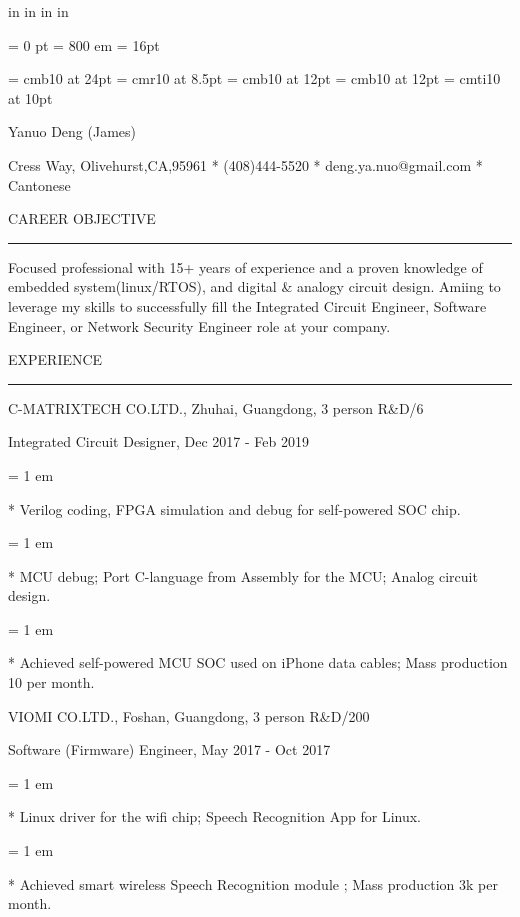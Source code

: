 \nopagenumbers

 in     %
 in    %
 in  %
 in  %

\parindent = 0 pt
\emergencystretch = 800 em
\baselineskip = 16pt


\font\FFaa=      cmb10            at 24pt
\font\FFbb=      cmr10            at 8.5pt
\font\FFcc=      cmb10            at 12pt
\font\FFdd=      cmb10            at 12pt
\font\FFee=      cmti10           at 10pt

\centerline{ \FFaa
Yanuo Deng (James)
}

\centerline{  Cress Way, Olivehurst,CA,95961
*
(408)444-5520
*
deng.ya.nuo@gmail.com
*
Cantonese
}

{ \medbreak } { \FFcc
CAREER OBJECTIVE
}

{ \smallbreak } {\par\noindent\hrule} { \smallbreak }

Focused professional with 15+ years of experience and a proven knowledge of embedded system(linux/RTOS), and digital \& analogy circuit design. Amiing to leverage my skills to successfully fill the Integrated Circuit Engineer, Software Engineer, or Network Security Engineer role at your company.

{ \medbreak } { \FFcc
EXPERIENCE
}
{ \smallbreak } {\par\noindent\hrule} { \smallbreak }

{ \medbreak } { \FFdd
C-MATRIXTECH CO.LTD., Zhuhai, Guangdong, 3 person R\&D/6
}

{ \FFee
Integrated Circuit Designer, Dec 2017 - Feb 2019
}

{ \parindent = 1 em \item{*} 
 Verilog coding, FPGA simulation and debug for self-powered SOC chip. 
}

{ \parindent = 1 em \item{*} 
 MCU debug; Port C-language from Assembly for the MCU; Analog circuit design.
}
{ \parindent = 1 em \item{*} 
 Achieved self-powered MCU SOC used on iPhone data cables; Mass production 10 per month.
}

{ \medbreak } { \FFdd
VIOMI CO.LTD., Foshan, Guangdong, 3 person R\&D/200
}

{ \FFee
Software (Firmware) Engineer, May 2017 - Oct 2017
}

{ \parindent = 1 em \item{*} 
 Linux driver for the wifi chip; Speech Recognition App for Linux.
 }
{ \parindent = 1 em \item{*} 
 Achieved smart wireless Speech Recognition module ; Mass production 3k per month.
 }

